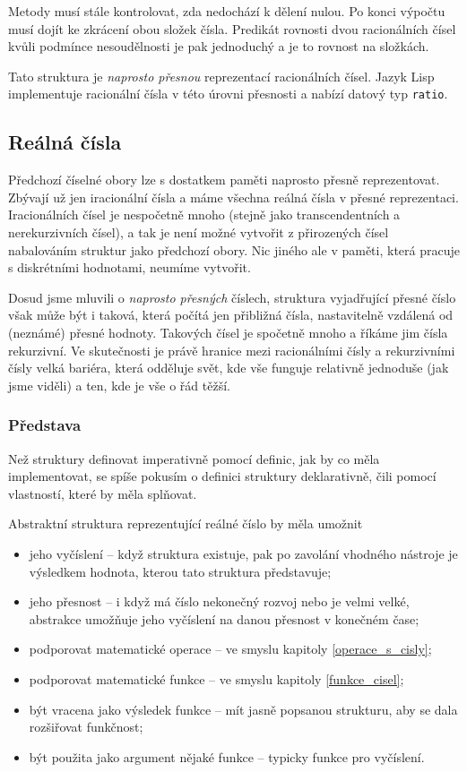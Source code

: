 Metody musí stále kontrolovat, zda nedochází k dělení nulou. Po konci výpočtu musí dojít ke zkrácení obou složek čísla. Predikát rovnosti dvou racionálních čísel kvůli podmínce nesoudělnosti je pak jednoduchý a je to rovnost na složkách.

Tato struktura je \textit{naprosto přesnou} reprezentací racionálních čísel. Jazyk Lisp implementuje racionální čísla v této úrovni přesnosti a nabízí datový typ \texttt{ratio}.

\subsection{Reálná čísla}
Předchozí číselné obory lze s dostatkem paměti naprosto přesně reprezentovat. Zbývají už jen iracionální čísla a máme všechna reálná čísla v přesné reprezentaci. Iracionálních čísel je nespočetně mnoho (stejně jako transcendentních a nerekurzivních čísel), a tak je není možné vytvořit z přirozených čísel nabalováním struktur jako předchozí obory. Nic jiného ale v paměti, která pracuje s diskrétními hodnotami, neumíme vytvořit.

Dosud jsme mluvili o \textit{naprosto přesných} číslech, struktura vyjadřující přesné číslo však může být i taková, která počítá jen přibližná čísla, nastavitelně vzdálená od (neznámé) přesné hodnoty. Takových čísel je spočetně mnoho a říkáme jim čísla rekurzivní. Ve skutečnosti je právě hranice mezi racionálními čísly a rekurzivními čísly velká bariéra, která odděluje svět, kde vše funguje relativně jednoduše (jak jsme viděli) a ten, kde je vše o řád těžší.

\subsubsection{Představa}\label{kap:predstava}
Než struktury definovat imperativně pomocí definic, jak by co měla implementovat, se spíše pokusím o definici struktury deklarativně, čili pomocí vlastností, které by měla splňovat.

Abstraktní struktura reprezentující reálné číslo by měla umožnit
\begin{itemize}
\item{jeho vyčíslení -- když struktura existuje, pak po zavolání vhodného nástroje je výsledkem hodnota, kterou tato struktura představuje;}
\item{jeho přesnost -- i když má číslo nekonečný rozvoj nebo je velmi velké, abstrakce umožňuje jeho vyčíslení na danou přesnost v konečném čase;}
\item{podporovat matematické operace -- ve smyslu kapitoly \ref{operace_s_cisly};}
\item{podporovat matematické funkce -- ve smyslu kapitoly \ref{funkce_cisel};}
\item{být vracena jako výsledek funkce -- mít jasně popsanou strukturu, aby se dala rozšiřovat funkčnost;}
\item{být použita jako argument nějaké funkce -- typicky funkce pro vyčíslení.}
\end{itemize}

